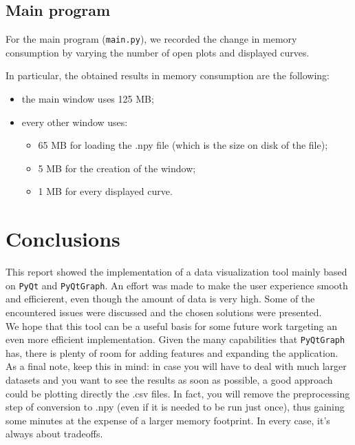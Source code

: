 \documentclass[11pt,a4paper]{article}
\begin{document}
\subsection{Main program}

For the main program (\texttt{main.py}), we recorded the change in memory consumption by varying the number of open plots and displayed curves.

In particular, the obtained results in memory consumption are the following:
\begin{itemize}
    \item the main window uses 125 MB;
    \item every other window uses:
    \begin{itemize}
    		\item 65 MB for loading the .npy file (which is the size on disk of the file);
    		\item 5 MB for the creation of the window;
    		\item 1 MB for every displayed curve.
	\end{itemize}
\end{itemize}


\section{Conclusions}
\label{sec:conclusions}

This report showed the implementation of a data visualization tool mainly based on \texttt{PyQt} and \texttt{PyQtGraph}.
An effort was made to make the user experience smooth and efficierent, even though the amount of data is very high.
Some of the encountered issues were discussed and the chosen solutions were presented.\\

We hope that this tool can be a useful basis for some future work targeting an even more efficient implementation.
Given the many capabilities that \texttt{PyQtGraph} has, there is plenty of room for adding features and expanding the application.\\

As a final note,  keep this in mind: in case you will have to deal with much larger datasets and you want to see the results as soon as possible, a good approach could be plotting directly the .csv files. In fact, you will remove the preprocessing step of conversion to .npy (even if it is needed to be run just once), thus gaining some minutes at the expense of a larger memory footprint. In every case, it's always about tradeoffs.


\end{document}
